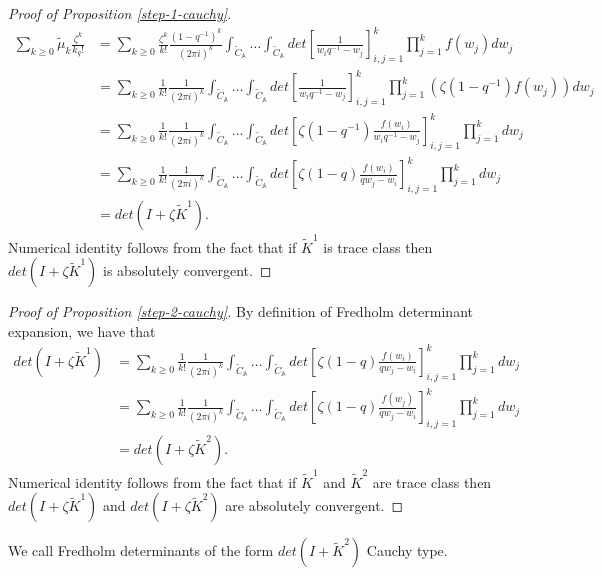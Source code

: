 \begin{proof}[Proof of Proposition \ref{step-1-cauchy}]
\begin{align*}
 \sum_{k \ge 0} \tilde{\mu}_k \frac{\zeta^k}{k_q!} &= \sum_{k \ge 0} \frac{\zeta^k}{k!} \frac{(1-q^{-1})^k}{(2 \pi i)^k} \int_{\tilde{C}_{\mathbb{A}}} \dots \int_{\tilde{C}_{\mathbb{A}}} det\left[ \frac{1}{w_i q^{-1} - w_j} \right]_{i,j=1}^k \prod_{j=1}^k f(w_j) dw_j \\
 &= \sum_{k \ge 0} \frac{1}{k!} \frac{1}{(2 \pi i)^k} \int_{\tilde{C}_{\mathbb{A}}} \dots \int_{\tilde{C}_{\mathbb{A}}} det\left[ \frac{1}{w_i q^{-1} - w_j} \right]_{i,j=1}^k \prod_{j=1}^k \left(\zeta (1-q^{-1}) f(w_j) \right) dw_j \\
 &= \sum_{k \ge 0} \frac{1}{k!} \frac{1}{(2 \pi i)^k} \int_{\tilde{C}_{\mathbb{A}}} \dots \int_{\tilde{C}_{\mathbb{A}}} det\left[ \zeta (1-q^{-1}) \frac{f(w_i)}{w_i q^{-1} - w_j} \right]_{i,j=1}^k \prod_{j=1}^k dw_j\\
 &= \sum_{k \ge 0} \frac{1}{k!} \frac{1}{(2 \pi i)^k} \int_{\tilde{C}_{\mathbb{A}}} \dots \int_{\tilde{C}_{\mathbb{A}}} det\left[ \zeta (1-q) \frac{f(w_i)}{qw_j - w_i} \right]_{i,j=1}^k \prod_{j=1}^k dw_j\\
 &= det(I+\zeta \tilde{K}^1).
\end{align*}
Numerical identity follows from the fact that if $\tilde{K}^1$ is trace class then $det(I+\zeta \tilde{K}^1)$ is absolutely convergent. 
\end{proof}

\begin{proof}[Proof of Proposition \ref{step-2-cauchy}]
By definition of Fredholm determinant expansion, we have that 
\begin{align*}
det(I+\zeta \tilde{K}^1) &= \sum_{k \ge 0} \frac{1}{k!} \frac{1}{(2 \pi i)^k} \int_{\tilde{C}_{\mathbb{A}}} \dots \int_{\tilde{C}_{\mathbb{A}}} det\left[ \zeta (1-q) \frac{f(w_i)}{qw_j - w_i} \right]_{i,j=1}^k \prod_{j=1}^k dw_j \\
&= \sum_{k \ge 0} \frac{1}{k!} \frac{1}{(2 \pi i)^k} \int_{\tilde{C}_{\mathbb{A}}} \dots \int_{\tilde{C}_{\mathbb{A}}} det\left[ \zeta (1-q) \frac{f(w_j)}{qw_j - w_i} \right]_{i,j=1}^k \prod_{j=1}^k dw_j \\
&= det(I+\zeta \tilde{K}^2).
\end{align*}
Numerical identity follows from the fact that if $\tilde{K}^1$ and $\tilde{K}^2$ are trace class then $det(I+\zeta \tilde{K}^1)$ and $det(I+\zeta \tilde{K}^2)$ are absolutely convergent. 
\end{proof}
We call Fredholm determinants of the form $det(I+\tilde{K}^2)$ Cauchy type.

